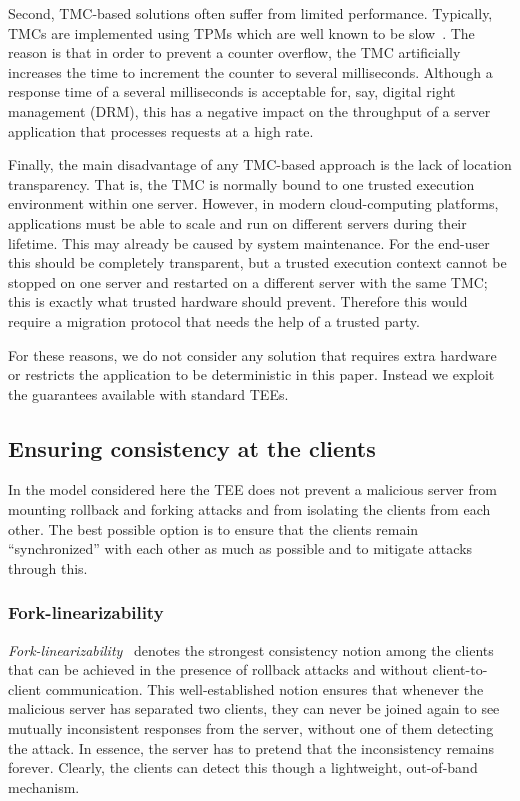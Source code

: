 \documentclass[11pt]{article}
\theoremstyle{plain-boldhead}
\theoremstyle{definition-boldhead}
\begin{document}
Second, TMC-based solutions often suffer from limited performance.
Typically, TMCs are implemented using TPMs which are well known to be
slow~\cite{parno2011}.  The reason is that in order to prevent a counter
overflow, the TMC artificially increases the time to increment the counter
to several milliseconds.  Although a response time of a several
milliseconds is acceptable for, say, digital right management (DRM), this
has a negative impact on the throughput of a server application
that processes requests at a high rate.

Finally, the main disadvantage of any TMC-based approach is the lack of
location transparency.  That is, the TMC is normally bound to one trusted
execution environment within one server. However, in modern cloud-com\-pu\-ting
platforms, applications must be able to scale and run on different servers
during their lifetime.  This may already be caused by system
maintenance.  For the end-user this should be completely transparent, but a
trusted execution context cannot be stopped on one server and restarted on
a different server with the same TMC; this is exactly what trusted
hardware should prevent.  Therefore this would require a migration
protocol that needs the help of a trusted party.

For these reasons, we do not consider any solution that requires extra
hardware or restricts the application to be deterministic in this paper.
Instead we exploit the guarantees available with standard TEEs.


\subsection{Ensuring consistency at the clients}

In the model considered here the TEE does not prevent a malicious server
from mounting rollback and forking attacks and from isolating the clients
from each other.  The best possible option is to ensure that the clients
remain ``synchronized'' with each other as much as possible and to mitigate
attacks through this.


\subsubsection{Fork-linearizability}

\emph{Fork-linearizability}~\cite{mazsha02} denotes the strongest consistency
notion among the clients that can be achieved in the presence of rollback attacks
and without client-to-client communication.  This well-established notion
ensures that whenever the malicious server has separated two clients, they
can never be joined again to see mutually inconsistent responses from the
server, without one of them detecting the attack.  In essence, the server
has to pretend that the inconsistency remains forever.  Clearly, the
clients can detect this though a lightweight, out-of-band mechanism.
\end{document}
